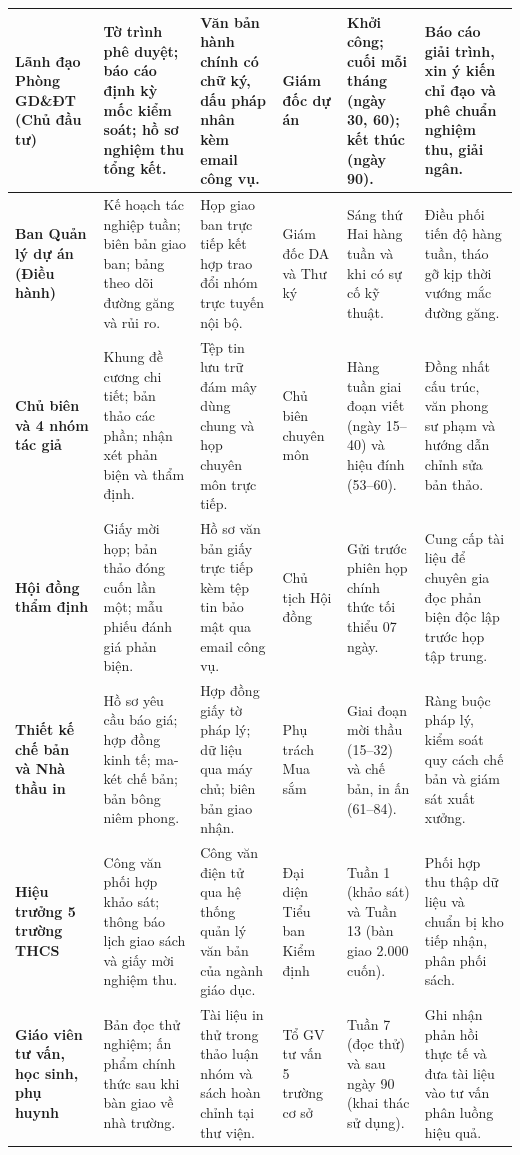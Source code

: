 \begin{center}
{\begin{longtable}{|p{2.6cm}|p{3.2cm}|p{2.6cm}|p{2.0cm}|p{2.2cm}|Y|}
\textbf{Lãnh đạo Phòng GD\&ĐT (Chủ đầu tư)} & Tờ trình phê duyệt; báo cáo định kỳ mốc kiểm soát; hồ sơ nghiệm thu tổng kết. & Văn bản hành chính có chữ ký, dấu pháp nhân kèm email công vụ. & Giám đốc dự án & Khởi công; cuối mỗi tháng (ngày 30, 60); kết thúc (ngày 90). & Báo cáo giải trình, xin ý kiến chỉ đạo và phê chuẩn nghiệm thu, giải ngân. \\
\hline
\textbf{Ban Quản lý dự án (Điều hành)} & Kế hoạch tác nghiệp tuần; biên bản giao ban; bảng theo dõi đường găng và rủi ro. & Họp giao ban trực tiếp kết hợp trao đổi nhóm trực tuyến nội bộ. & Giám đốc DA và Thư ký & Sáng thứ Hai hàng tuần và khi có sự cố kỹ thuật. & Điều phối tiến độ hàng tuần, tháo gỡ kịp thời vướng mắc đường găng. \\
\hline
\textbf{Chủ biên và 4 nhóm tác giả} & Khung đề cương chi tiết; bản thảo các phần; nhận xét phản biện và thẩm định. & Tệp tin lưu trữ đám mây dùng chung và họp chuyên môn trực tiếp. & Chủ biên chuyên môn & Hàng tuần giai đoạn viết (ngày 15--40) và hiệu đính (53--60). & Đồng nhất cấu trúc, văn phong sư phạm và hướng dẫn chỉnh sửa bản thảo. \\
\hline
\textbf{Hội đồng thẩm định} & Giấy mời họp; bản thảo đóng cuốn lần một; mẫu phiếu đánh giá phản biện. & Hồ sơ văn bản giấy trực tiếp kèm tệp tin bảo mật qua email công vụ. & Chủ tịch Hội đồng & Gửi trước phiên họp chính thức tối thiểu 07 ngày. & Cung cấp tài liệu để chuyên gia đọc phản biện độc lập trước họp tập trung. \\
\hline
\textbf{Thiết kế chế bản và Nhà thầu in} & Hồ sơ yêu cầu báo giá; hợp đồng kinh tế; ma-két chế bản; bản bông niêm phong. & Hợp đồng giấy tờ pháp lý; dữ liệu qua máy chủ; biên bản giao nhận. & Phụ trách Mua sắm & Giai đoạn mời thầu (15--32) và chế bản, in ấn (61--84). & Ràng buộc pháp lý, kiểm soát quy cách chế bản và giám sát xuất xưởng. \\
\hline
\textbf{Hiệu trưởng 5 trường THCS} & Công văn phối hợp khảo sát; thông báo lịch giao sách và giấy mời nghiệm thu. & Công văn điện tử qua hệ thống quản lý văn bản của ngành giáo dục. & Đại diện Tiểu ban Kiểm định & Tuần 1 (khảo sát) và Tuần 13 (bàn giao 2.000 cuốn). & Phối hợp thu thập dữ liệu và chuẩn bị kho tiếp nhận, phân phối sách. \\
\hline
\textbf{Giáo viên tư vấn, học sinh, phụ huynh} & Bản đọc thử nghiệm; ấn phẩm chính thức sau khi bàn giao về nhà trường. & Tài liệu in thử trong thảo luận nhóm và sách hoàn chỉnh tại thư viện. & Tổ GV tư vấn 5 trường cơ sở & Tuần 7 (đọc thử) và sau ngày 90 (khai thác sử dụng). & Ghi nhận phản hồi thực tế và đưa tài liệu vào tư vấn phân luồng hiệu quả. \\
\hline
\end{longtable}
}
\end{center}


